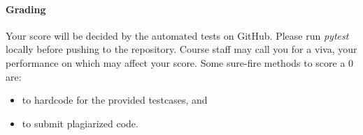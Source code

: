 \documentclass[a4paper]{exam}
\begin{document}
\begin{questions}
  \paragraph{Grading} Your score will be decided by the automated tests on GitHub. Please run \textit{pytest} locally before pushing to the repository. Course staff may call you for a viva, your performance on which may affect your score. Some sure-fire methods to score a 0 are:
  \begin{itemize}
  \item to hardcode for the provided testcases, and
  \item to submit plagiarized code.
  \end{itemize}
  
  \begin{solution}
  \end{solution}
\end{questions}
\end{document}
